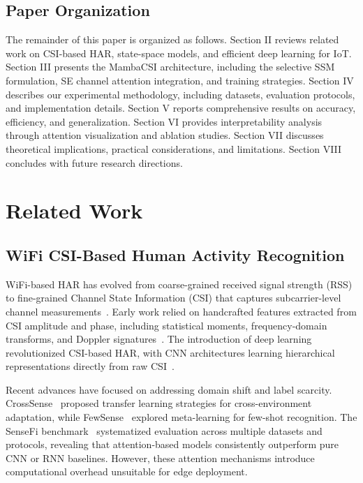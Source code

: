\documentclass[journal]{IEEEtran}
\begin{document}
\subsection{Paper Organization}

The remainder of this paper is organized as follows. Section II reviews related work on CSI-based HAR, state-space models, and efficient deep learning for IoT. Section III presents the MambaCSI architecture, including the selective SSM formulation, SE channel attention integration, and training strategies. Section IV describes our experimental methodology, including datasets, evaluation protocols, and implementation details. Section V reports comprehensive results on accuracy, efficiency, and generalization. Section VI provides interpretability analysis through attention visualization and ablation studies. Section VII discusses theoretical implications, practical considerations, and limitations. Section VIII concludes with future research directions.

\section{Related Work}

\subsection{WiFi CSI-Based Human Activity Recognition}

WiFi-based HAR has evolved from coarse-grained received signal strength (RSS) to fine-grained Channel State Information (CSI) that captures subcarrier-level channel measurements~\cite{wang2023privacy}. Early work relied on handcrafted features extracted from CSI amplitude and phase, including statistical moments, frequency-domain transforms, and Doppler signatures~\cite{wang2017survey}. The introduction of deep learning revolutionized CSI-based HAR, with CNN architectures learning hierarchical representations directly from raw CSI~\cite{yang2023sensefi}.

Recent advances have focused on addressing domain shift and label scarcity. CrossSense~\cite{zhang2021crosssense} proposed transfer learning strategies for cross-environment adaptation, while FewSense~\cite{fewsense2022} explored meta-learning for few-shot recognition. The SenseFi benchmark~\cite{yang2023sensefi} systematized evaluation across multiple datasets and protocols, revealing that attention-based models consistently outperform pure CNN or RNN baselines. However, these attention mechanisms introduce computational overhead unsuitable for edge deployment.
\end{document}
